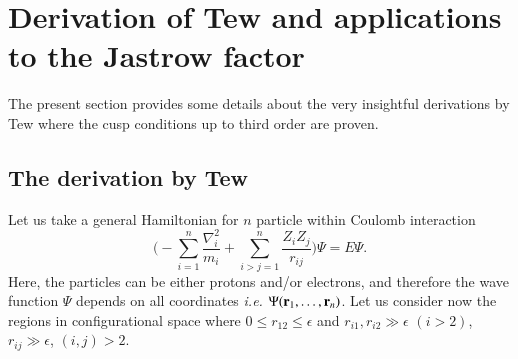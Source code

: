 \documentclass[aip,jcp,reprint,noshowkeys,superscriptaddress]{revtex4-1}
\newcommand{\bd}[1]{{\bf {#1}}}
\begin{document}
\section{Derivation of Tew and applications to the Jastrow factor}
The present section provides some details about the very insightful derivations by Tew\cite{Tew-JCP-08} where the cusp conditions up to third order are proven. 
\subsection{The derivation by Tew}
Let us take a general Hamiltonian for $n$ particle within Coulomb interaction
\begin{equation}
 \bigg( -\sum_{i=1}^n \frac{\nabla_i^2}{m_i} + \sum_{i>j=1}^n \frac{Z_i Z_j}{r_{ij}}\bigg) \Psi = E \Psi .
\end{equation}
Here, the particles can be either protons and/or electrons, and therefore the wave function $\Psi$ depends on all coordinates \textit{i.e.} $\Psi(\bd{r}_1,\hdots,\bd{r}_n)$. 
Let us consider now the regions in configurational space where $0\le r_{12}\le\epsilon$ and $r_{i1},r_{i2}\gg \epsilon$ $(i>2)$, $r_{ij}\gg \epsilon$, $(i,j)>2$.
\end{document}
